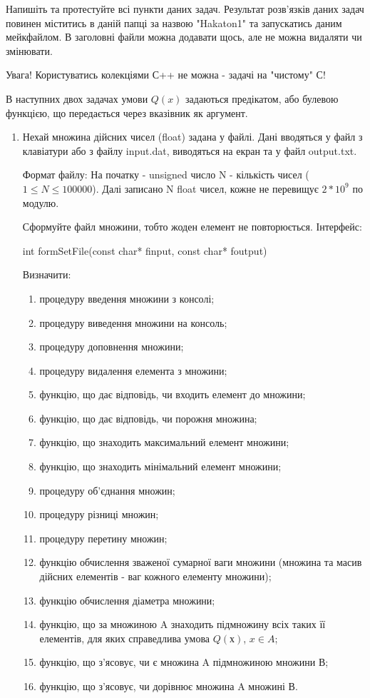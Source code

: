 \documentclass[]{article}
\date{}
\makeatletter
\newcommand{\xslalph}[1]{\expandafter\@xslalph\csname c@#1\endcsname}
\newcommand{\@xslalph}[1]{%
    \ifcase#1\or а\or б\or в\or г\or д\or e\or є\or ж\or з\or i%
    \or й\or к\or л\or м\or н\or о\or п\or р\or с\or т%
    \or у\or ф\or х\or ц\or ч\or ш\or ю\or я\or аа\or бб\or вв %
    \else\@ctrerr\fi%
}
\makeatother
\begin{document}
Напишіть та протестуйте всі пункти даних задач. 
Результат розв'язків даних задач повинен міститись в даній папці за назвою "Hakaton1"
та запускатись даним мейкфайлом.
В заголовні файли можна додавати щось, але не можна видаляти чи змінювати.

Увага! Користуватись колекціями С++ не можна - задачі на "чистому" С!


В наступних двох задачах умови $Q(x)$ задаються предікатом, або 
булевою функцією, що передається через вказівник як аргумент.
\begin{enumerate}
\item 
Нехай множина дійсних чисел (float) задана у файлі. 
Дані вводяться у файл з клавіатури або з файлу input.dat, 
виводяться на екран та у файл output.txt.

Формат файлу:
На початку - unsigned число N - кількість чисел ($1 \le N \le 100000$). Далі
записано N float чисел, кожне не перевищує $2 * 10^9$ по модулю.

Сформуйте файл множини, тобто жоден елемент не повторюється.
Інтерфейс:

int formSetFile(const char* finput, const char* foutput)

Визначити:
\begin{enumerate}[label=\xslalph*)]
\item процедуру введення множини з консолі;
\item процедуру виведення множини на консоль;
\item процедуру доповнення множини;
\item процедуру видалення елемента з множини;
\item функцію, що дає відповідь, чи входить елемент до множини;
\item функцію, що дає відповідь, чи порожня множина;
\item функцію, що знаходить максимальний елемент множини;
\item функцію, що знаходить мінімальний елемент множини;
\item процедуру об'єднання множин;
\item процедуру різниці множин;
\item процедуру перетину множин;
\item функцію обчислення зваженої сумарної ваги множини (множина та масив дійсних елементів - ваг кожного елементу множини);
\item функцію обчислення діаметра множини;
\item функцію, що за множиною A знаходить підмножину всіх таких її
елементів, для яких справедлива умова $Q(х)$, $x\in A$;
\item функцію, що з'ясовує, чи є множина A підмножиною множини В;
\item функцію, що з'ясовує, чи дорівнює множина A множині В.
\end{enumerate}


\end{enumerate}
\end{document}
